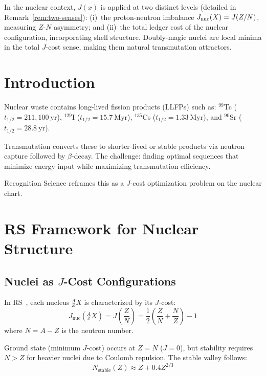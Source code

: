 \documentclass[12pt,a4paper]{article}
\theoremstyle{definition}
\theoremstyle{remark}
\begin{document}
\noindent In the nuclear context, $J(x)$ is applied at two distinct levels
(detailed in Remark~\ref{rem:two-senses}): (i)~the proton-neutron imbalance
$J_{\rm nuc}(X) = J(Z/N)$, measuring $Z$-$N$ asymmetry; and (ii)~the total
ledger cost of the nuclear configuration, incorporating shell structure.
Doubly-magic nuclei are local minima in the total $J$-cost sense, making
them natural transmutation attractors.

\section{Introduction}
\label{sec:intro}

Nuclear waste contains long-lived fission products (LLFPs) such as:
${}^{99}$Tc ($t_{1/2} = 211,100~\mathrm{yr}$), ${}^{129}$I ($t_{1/2} = 15.7~\mathrm{Myr}$), 
${}^{135}$Cs ($t_{1/2} = 1.33~\mathrm{Myr}$), and ${}^{90}$Sr ($t_{1/2} = 28.8~\mathrm{yr}$).

Transmutation converts these to shorter-lived or stable products via neutron capture 
followed by $\beta$-decay. The challenge: finding optimal sequences that minimize energy 
input while maximizing transmutation efficiency.

Recognition Science reframes this as a $J$-cost optimization problem on the nuclear chart.

\section{RS Framework for Nuclear Structure}

\subsection{Nuclei as $J$-Cost Configurations}

In RS~\cite{RS_Axioms}, each nucleus $^A_Z X$ is characterized by
its $J$-cost:
\begin{equation}
J_\mathrm{nuc}(^A_Z X) = J\!\left(\frac{Z}{N}\right) = \frac{1}{2}\left(\frac{Z}{N} + \frac{N}{Z}\right) - 1
\end{equation}
where $N = A - Z$ is the neutron number.

Ground state (minimum $J$-cost) occurs at $Z = N$ ($J = 0$), but stability requires 
$N > Z$ for heavier nuclei due to Coulomb repulsion. The stable valley follows:
\begin{equation}
N_\mathrm{stable}(Z) \approx Z + 0.4 Z^{2/3}
\end{equation}
\end{document}
